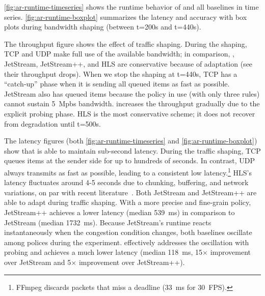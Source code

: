  \autoref{fig:ar-runtime-timeseries} shows the runtime behavior
of \sysname{} and all baselines in time series. \autoref{fig:ar-runtime-boxplot}
summarizes the latency and accuracy with box plots during bandwidth shaping
(between t=200s and t=440s).

The throughput figure shows the effect of traffic shaping. During the shaping,
TCP and UDP make full use of the available bandwidth; in comparison, \sysname{},
JetStream, JetStream++, and HLS are conservative because of adaptation (see
their throughput drops). When we stop the shaping at t=440s, TCP has a
``catch-up'' phase when it is sending all queued items as fast as
possible. JetStream also has queued items because the policy in use (with only
three rules) cannot sustain \SI{5}{Mpbs} bandwidth. \sysname{} increases the
throughput gradually due to the explicit probing phase. HLS is the most
conservative scheme; it does not recover from degradation until t=500s.


The latency figures (both \autoref{fig:ar-runtime-timeseries} and
\autoref{fig:ar-runtime-boxplot}) show that \sysname{} is able to maintain
sub-second latency. During the traffic shaping, TCP queues items at the sender
side for up to hundreds of seconds. In contrast, UDP always transmits as fast as
possible, leading to a consistent low latency.\footnote{FFmpeg discards packets
  that miss a deadline (\SI{33}{\ms} for \SI{30}{FPS}).} HLS's latency
fluctuates around 4-5 seconds due to chunking, buffering, and network
variations, on par with recent literature~\cite{wang2016anatomy}. Both JetStream
and JetStream++ are able to adapt during traffic shaping. With a more precise
and fine-grain policy, JetStream++ achieves a lower latency (median
\SI{539}{\ms}) in comparison to JetStream (median \SI{1732}{\ms}). Because
JetStream's runtime reacts instantaneously when the congestion condition
changes, both baselines oscillate among polices during the
experiment. \sysname{} effectively addresses the oscillation with probing and
achieves a much lower latency (median \SI{118}{\ms}, 15$\times$ improvement over
JetStream and 5$\times$ improvement over JetStream++).

